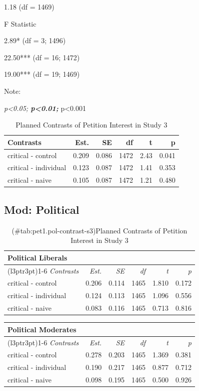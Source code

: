 \documentclass[
]{book}
\begin{document}
1.18 (df = 1469)

F Statistic

2.89* (df = 3; 1496)

22.50*** (df = 16; 1472)

19.00*** (df = 19; 1469)

Note:

\emph{p\textless0.05; \textbf{p\textless0.01; }}p\textless0.001

\begin{table}

\caption{\label{tab:pet1-contrast-s3}Planned Contrasts of Petition Interest in Study 3}
\centering
\fontsize{13}{15}\selectfont
\begin{tabular}[t]{lrrrrr}
\toprule
Contrasts & Est. & SE & df & t & p\\
\midrule
critical - control & 0.209 & 0.086 & 1472 & 2.43 & 0.041\\
critical - individual & 0.123 & 0.087 & 1472 & 1.41 & 0.353\\
critical - naive & 0.105 & 0.087 & 1472 & 1.21 & 0.480\\
\bottomrule
\end{tabular}
\end{table}

\hypertarget{mod-political-11}{%
\subsection{Mod: Political}\label{mod-political-11}}

\begin{table}

\caption{(\#tab:pet1.pol-contrast-s3)Planned Contrasts of Petition Interest in Study 3}
\centering
\begin{tabular}[t]{lrrrrr}
\toprule
\multicolumn{6}{l}{Political Liberals} \\
\cmidrule(l{3pt}r{3pt}){1-6}
\em{Contrasts} & \em{Est.} & \em{SE} & \em{df} & \em{t} & \em{p}\\
\midrule
critical - control & 0.206 & 0.114 & 1465 & 1.810 & 0.172\\
critical - individual & 0.124 & 0.113 & 1465 & 1.096 & 0.556\\
critical - naive & 0.083 & 0.116 & 1465 & 0.713 & 0.816\\
\bottomrule
\end{tabular}
\end{table}

\begin{table}
\centering
\begin{tabular}{lrrrrr}
\toprule
\multicolumn{6}{l}{Political Moderates} \\
\cmidrule(l{3pt}r{3pt}){1-6}
\em{Contrasts} & \em{Est.} & \em{SE} & \em{df} & \em{t} & \em{p}\\
\midrule
critical - control & 0.278 & 0.203 & 1465 & 1.369 & 0.381\\
critical - individual & 0.190 & 0.217 & 1465 & 0.877 & 0.712\\
critical - naive & 0.098 & 0.195 & 1465 & 0.500 & 0.926\\
\bottomrule
\end{tabular}
\end{table}
\end{document}
